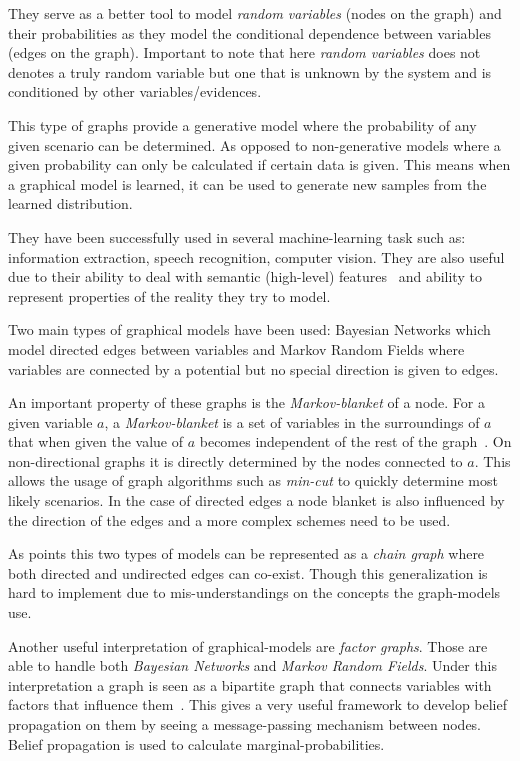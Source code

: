 They serve as a better tool to model \emph{random variables}
(nodes on the graph) and their probabilities as they model the conditional
dependence between variables (edges on the graph). Important to note that here
\emph{random variables} does not denotes a truly random variable but one that is
unknown by the system and is conditioned by other variables/evidences.

This type of graphs provide a generative model where the probability of any
given scenario can be determined. As opposed to non-generative models where a
given probability can only be calculated if certain data is given.
This means when a graphical model is learned, it can be used to generate new
samples from the learned distribution.

They have been successfully used in several machine-learning task such as:
information extraction, speech recognition, computer vision.
They are also useful due to their ability to deal with semantic (high-level)
features~\citep{boutell2006factor} and ability to represent properties of the
reality they try to model.

Two main types of graphical models have been used: Bayesian Networks which model
directed edges between variables and Markov Random Fields where variables are
connected by a potential but no special direction is given to edges.

An important property of these graphs is the \emph{Markov-blanket} of a node.
For a given variable $a$, a \emph{Markov-blanket} is a set of variables in the
surroundings of $a$ that when given the value of $a$ becomes independent of the
rest of the graph~\citep{pearl1988probabilistic}.
On non-directional graphs it is directly determined by the nodes connected to $a$.
This allows the usage of graph algorithms such as \emph{min-cut} to quickly
determine most likely scenarios. In the case of directed edges a node blanket is
also influenced by the direction of the edges and a more complex schemes need to
be used.

As \cite{lauritzen2002chain} points this two types of models can be represented
as a \emph{chain graph} where both directed and undirected edges can co-exist.
Though this generalization is hard to implement due to mis-understandings on the
concepts the graph-models use.

Another useful interpretation of graphical-models are \emph{factor graphs}.
Those are able to handle both \emph{Bayesian Networks} and
\emph{Markov Random Fields}. Under this interpretation a graph is seen as a
bipartite graph that connects variables with factors that influence
them~\citep{bishop2006pattern}.
This gives a very useful framework to develop belief propagation on them by
seeing a message-passing mechanism between nodes. Belief propagation is used to
calculate marginal-probabilities.

